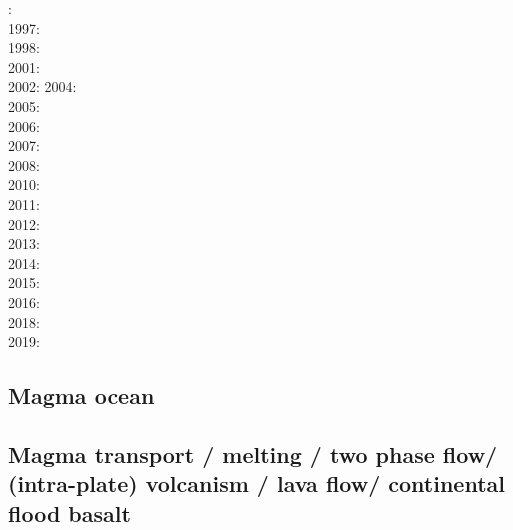 {\scriptsize
{}: \cite{dagu86}\\
1997: \cite{kell97}\\
1998: \cite{tack98b}\\
2001: \cite{soga01}\\
2002: \cite{somo02}\cite{tagh02}
2004: \cite{mczh04}\cite{nata04}\\
2005: \cite{mczh05a}\cite{nata05}\cite{nata05b}\\
2006: \cite{nata06}\\
2007: \cite{heta07}\\
2008: \cite{gamc08}\cite{nata08}\\
2010: \cite{stto10}\cite{mcgr10}\cite{nata10}\cite{vady10}\\
2011: \cite{bowg11}\cite{talz11}\cite{vayj11}\\
2012: \cite{stto12}\cite{dagd12}\cite{dect12}\\
2013: \cite{limc13}\cite{bogs13a}\cite{bogs13b}\\
2014: \cite{budt14}\cite{lidt14}\cite{tovd14}\\
2015: \cite{musd15}\cite{hafg15}\cite{delt15}\cite{wilm15}\\
2016: \cite{dost16}\cite{tosa16}\\
2018: \cite{daga18}\cite{lizo18}\cite{hect18}\\
2019: \cite{hebo19}\cite{rejv19}
}

\subsection{Magma ocean}

{\scriptsize
\noindent
\cite{elvh02}
\cite{devv10}
\cite{ullc12}
\cite{maha15}
}

\subsection{Magma transport / melting / two phase flow/ (intra-plate) volcanism / lava flow/ 
continental flood basalt}

